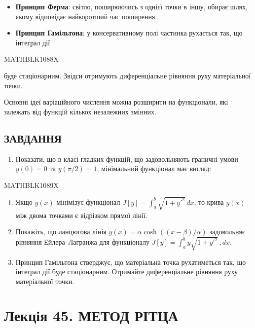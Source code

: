 \documentclass[
  ukrainian,
]{article}
\providecommand{\tightlist}{%
  \setlength{\itemsep}{0pt}\setlength{\parskip}{0pt}}
\begin{document}
\begin{itemize}
\tightlist
\item
  \textbf{Принцип Ферма}: світло, поширюючись з однієї точки в іншу,
  обирає шлях, якому відповідає найкоротший час поширення.
\item
  \textbf{Принцип Гамільтона}: у консервативному полі частинка рухається
  так, що інтеграл дії
\end{itemize}

MATHBLK1088X

буде стаціонарним. Звідси отримують диференціальне рівняння руху
матеріальної точки.

Основні ідеї варіаційного числення можна розширити на функціонали, які
залежать від функцій кількох незалежних змінних.

\subsection{ЗАВДАННЯ}\label{ux437ux430ux432ux434ux430ux43dux43dux44f-18}

\begin{enumerate}
\def\labelenumi{\arabic{enumi}.}
\tightlist
\item
  Показати, що в класі гладких функцій, що задовольняють граничні умови
  \(y(0)=0\) та \(y(\pi/2)=1\), мінімальний функціонал має вигляд:
\end{enumerate}

MATHBLK1089X

\begin{enumerate}
\def\labelenumi{\arabic{enumi}.}
\setcounter{enumi}{1}
\item
  Якщо \(y(x)\) мінімізує функціонал
  \(J[y] = \int_a^b \sqrt{1+y'^2}\, dx\), то крива \(y(x)\) між двома
  точками є відрізком прямої лінії.
\item
  Покажіть, що ланцюгова лінія \(y(x) = \alpha\cosh((x-\beta)/\alpha)\)
  задовольняє рівняння Ейлера--Лагранжа для функціоналу
  \(J[y] = \int_a^b y\sqrt{1+y'^2}\,,dx\).
\item
  Принцип Гамільтона стверджує, що матеріальна точка рухатиметься так,
  що інтеграл дії буде стаціонарним. Отримайте диференціальне рівняння
  руху матеріальної точки.
\end{enumerate}

\section{Лекція 45. МЕТОД
РІТЦА}\label{ux43bux435ux43aux446ux456ux44f-45.-ux43cux435ux442ux43eux434-ux440ux456ux442ux446ux430}
\end{document}
